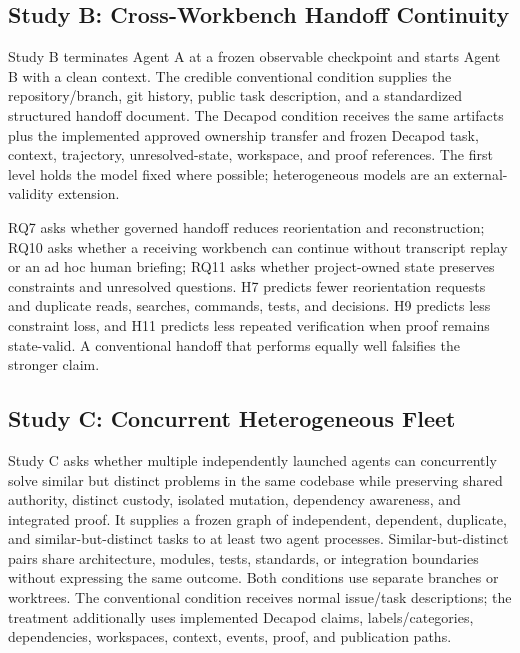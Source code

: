 \subsection{Study B: Cross-Workbench Handoff Continuity}

Study B terminates Agent A at a frozen observable checkpoint and starts Agent B with a clean context. The credible conventional condition supplies the repository/branch, git history, public task description, and a standardized structured handoff document. The Decapod condition receives the same artifacts plus the implemented approved ownership transfer and frozen Decapod task, context, trajectory, unresolved-state, workspace, and proof references. The first level holds the model fixed where possible; heterogeneous models are an external-validity extension.

RQ7 asks whether governed handoff reduces reorientation and reconstruction; RQ10 asks whether a receiving workbench can continue without transcript replay or an ad hoc human briefing; RQ11 asks whether project-owned state preserves constraints and unresolved questions. H7 predicts fewer reorientation requests and duplicate reads, searches, commands, tests, and decisions. H9 predicts less constraint loss, and H11 predicts less repeated verification when proof remains state-valid. A conventional handoff that performs equally well falsifies the stronger claim.

\subsection{Study C: Concurrent Heterogeneous Fleet}

Study C asks whether multiple independently launched agents can concurrently solve similar but distinct problems in the same codebase while preserving shared authority, distinct custody, isolated mutation, dependency awareness, and integrated proof. It supplies a frozen graph of independent, dependent, duplicate, and similar-but-distinct tasks to at least two agent processes. Similar-but-distinct pairs share architecture, modules, tests, standards, or integration boundaries without expressing the same outcome. Both conditions use separate branches or worktrees. The conventional condition receives normal issue/task descriptions; the treatment additionally uses implemented Decapod claims, labels/categories, dependencies, workspaces, context, events, proof, and publication paths.

